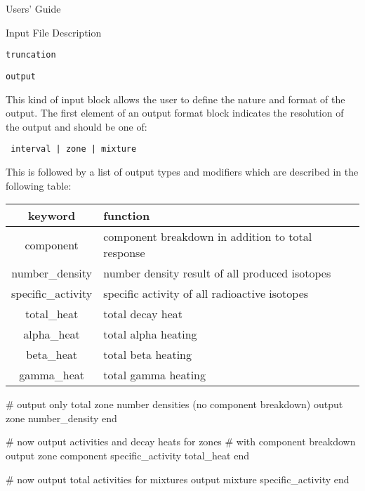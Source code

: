 \begin{chapter}{Users' Guide\label{app:user.guide}}
\begin{section}{Input File Description\label{app:user.input}}
\begin{subsection}{\texttt{truncation}\label{app:user.input.trunc}}
    \end{subsection}

    \begin{subsection}{\texttt{output}\label{app:user.input.output}}
      
      This kind of input block allows the user to define the nature
      and format of the output.  The first element of an output format
      block indicates the resolution of the output and should be one
      of:
      \begin{center}
        \texttt{ interval | zone | mixture }
      \end{center}
      This is followed by a list of output types and modifiers which
      are described in the following table:

      \begin{center}
        \renewcommand{\baselinestretch}{1}\normalsize
        \begin{tabular}{|c|l|}
          \hline
          keyword & function \\\hline\hline
          component & component breakdown in addition to total response\\\hline
          number\_density & number density result of all produced isotopes\\\hline
          specific\_activity & specific activity of all radioactive isotopes\\\hline
          total\_heat & total decay heat\\\hline
          alpha\_heat & total alpha heating\\\hline
          beta\_heat & total beta heating\\\hline
          gamma\_heat & total gamma heating\\\hline
        \end{tabular}

        \vspace{2\baselineskip}

        \begin{boxedverbatim}
# output only total zone number densities (no component breakdown)
output zone
   number_density
end

# now output activities and decay heats for zones
#   with component breakdown
output zone
   component
   specific_activity
   total_heat
end

# now output total activities for mixtures
output mixture
   specific_activity
end
\end{boxedverbatim}
      \end{center}      




\end{subsection}
\end{section}
\end{chapter}
